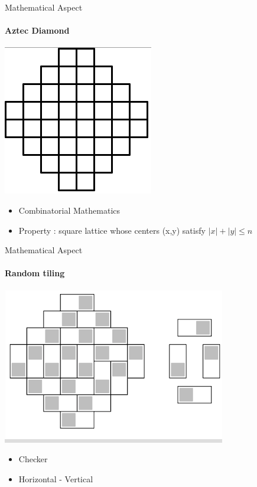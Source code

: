 \documentclass [xcolor=svgnames, t] {beamer}
\begin{document}
 
   \begin{frame}{Mathematical Aspect}
\framesubtitle{Aztec Diamond}
\begin{itemize}
\begin{center}
\includegraphics[scale=0.55]{Graph1.png}
\end{center}
\end{itemize}

\begin{itemize}
\begin{itemize}
  \item Combinatorial Mathematics \\
     \item Property : square lattice whose centers (x,y) satisfy $|x| + |y| \leq n$
     
     
 \end{itemize}
\end{itemize}
\end{frame}
 
 
 \begin{frame}{Mathematical Aspect}
 \framesubtitle{Random tiling}
 \begin{itemize}
    \begin{center}
\includegraphics[scale=0.55]{Echec.png}

\end{center}
 \end{itemize}
 \begin{itemize}
     \item Checker
     \item Horizontal - Vertical
     
     
 \end{itemize}
 \end{frame}
  
\end{document}

